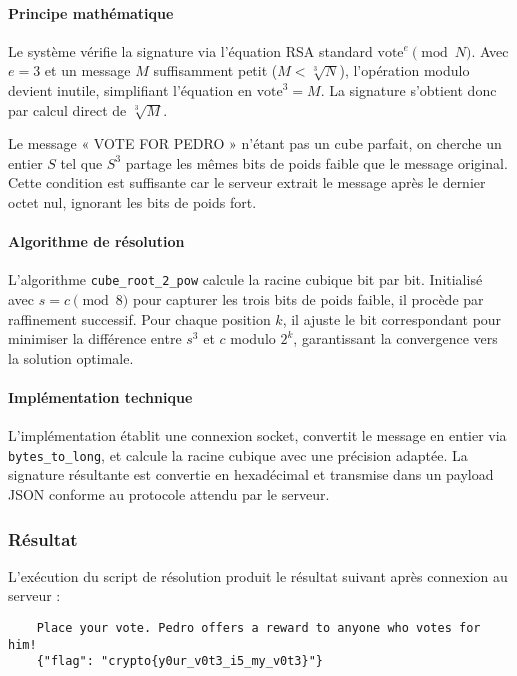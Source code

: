     \paragraph{Principe mathématique}
    Le système vérifie la signature via l'équation RSA standard
    $\text{vote}^e \pmod{N}$. Avec $e = 3$ et un message $M$ suffisamment
    petit ($M < \sqrt[3]{N}$), l'opération modulo devient inutile,
    simplifiant l'équation en $\text{vote}^3 = M$. La signature s'obtient
    donc par calcul direct de $\sqrt[3]{M}$.

    Le message « VOTE FOR PEDRO » n'étant pas un cube parfait, on cherche
    un entier $S$ tel que $S^3$ partage les mêmes bits de poids faible que
    le message original. Cette condition est suffisante car le serveur
    extrait le message après le dernier octet nul, ignorant les bits de
    poids fort.

    \paragraph{Algorithme de résolution}
    L'algorithme \texttt{cube\_root\_2\_pow} calcule la racine cubique bit par
    bit. Initialisé avec $s = c \pmod{8}$ pour capturer les trois bits de
    poids faible, il procède par raffinement successif. Pour chaque
    position $k$, il ajuste le bit correspondant pour minimiser la
    différence entre $s^3$ et $c$ modulo $2^k$, garantissant la convergence
    vers la solution optimale.

    \paragraph{Implémentation technique}
    L'implémentation établit une connexion socket, convertit le message en
    entier via \texttt{bytes\_to\_long}, et calcule la racine cubique avec
    une précision adaptée. La signature résultante est convertie en
    hexadécimal et transmise dans un payload JSON conforme au protocole
    attendu par le serveur.

    \subsubsection{Résultat}
    L'exécution du script de résolution produit le résultat suivant après
    connexion au serveur :

    \begin{verbatim}
    Place your vote. Pedro offers a reward to anyone who votes for him!
    {"flag": "crypto{y0ur_v0t3_i5_my_v0t3}"}
    \end{verbatim}
